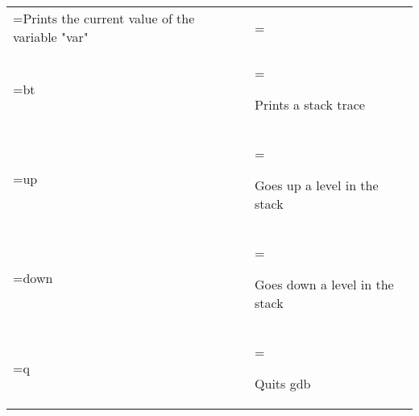 \begin{table}[htbp]
\begin{tabularx}{\textwidth}{
            >{\hsize=0.20\hsize\linewidth=\hsize}X
            >{\hsize=0.80\hsize\linewidth=\hsize}X}
        Prints the current value of the variable "var"                   \\

        bt               &

        Prints a stack trace                                             \\

        up               &

        Goes up a level in the stack                                     \\

        down             &

        Goes down a level in the stack                                   \\

        q                &

        Quits gdb                                                        \\

        \hline
    \end{tabularx}
\end{table}